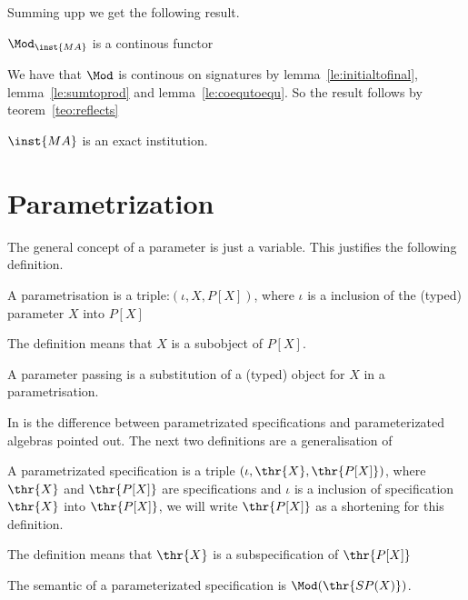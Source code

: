 Summing upp we get the following result.
\begin{proposition}
$\Mod_{\inst{MA}}$ is a continous functor
\end{proposition}


\begin{PROOF}
We have that $\Mod$ is continous on signatures by lemma~\ref{le:initialtofinal}, lemma~\ref{le:sumtoprod} and lemma~\ref{le:coequtoequ}. So the result follows by teorem~\ref{teo:reflects}
\end{PROOF}


\begin{corollary}
$\inst{MA}$ is an exact institution.
\end{corollary}



\section{Parametrization}
\label{se:parameterization}


The general concept of a parameter is just a variable. This justifies the following definition.

\begin{definition}
A parametrisation is a triple:$(\iota,X,P[X])$, where $\iota$ is a inclusion of the (typed) parameter $X$ into $P[X]$
\end{definition}

The definition means that $X$ is a subobject of $P[X]$.


\begin{definition}
A parameter passing is a substitution of a (typed) object for $X$ in a parametrisation.
\end{definition}

In \cite{para} is the difference between parametrizated specifications and parameterizated algebras pointed out. The next two definitions are a generalisation of \cite{para}

\begin{definition}
A parametrizated specification is a triple $(\iota,\thr{X},\thr{P[X]})$, where $\thr{X}$ and $\thr{P[X]}$ are specifications and $\iota$ is a inclusion of specification $\thr{X}$ into $\thr{P[X]}$, we will write $\thr{P[X]}$ as a shortening for this definition.
\end{definition}

The definition means that $\thr{X}$ is a subspecification of $\thr{P[X]}$


\begin{definition}
The semantic of a parameterizated specification is $\Mod(\thr{SP(X)})$.
\end{definition}

